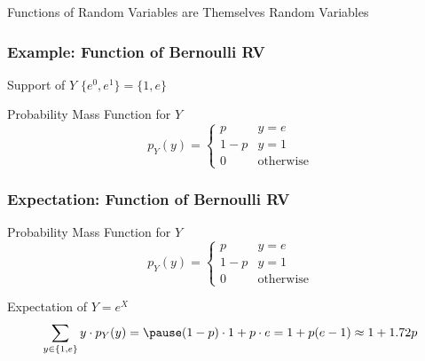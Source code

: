 
\begin{frame}
\begin{center}
\Huge Functions of Random Variables are Themselves Random Variables
\end{center}

\end{frame}

\begin{frame}
\frametitle{Example: Function of Bernoulli RV}
\vspace{2em}

\begin{block}{Support of $Y$} \pause
$\{e^0, e^1\} =\{1, e\}$
\end{block}

\begin{block}{Probability Mass Function for $Y$} \pause
	$$p_Y(y) = \left\{\begin{array}{ll}p& y =e\\ 1-p& y = 1\\ 0& \mbox{otherwise}\end{array}\right.$$
\end{block}

\end{frame}
\begin{frame}
\frametitle{Expectation: Function of Bernoulli RV}
\vspace{2em}

\begin{block}{Probability Mass Function for $Y$} 
	$$p_Y(y) = \left\{\begin{array}{ll}p& y =e\\ 1-p& y = 1\\ 0& \mbox{otherwise}\end{array}\right.$$
\end{block}

\begin{block}{Expectation of $Y = e^X$}\pause
$$\sum_{y \in \{1, e\}} y \cdot p_Y(y) =\pause (1-p) \cdot 1 + p \cdot e = 1 + p(e - 1) \approx 1 + 1.72 p$$
\end{block}


\end{frame}
